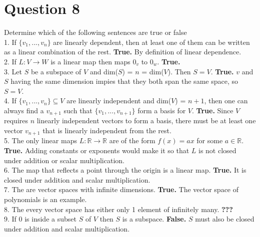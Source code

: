 \documentclass{article}
\begin{document}
\section*{Question 8}
Determine which of the following sentences are true or false \\
1. If $\{v_1, ..., v_n\}$ are linearly dependent, then at least one of them can be written as a linear combination of the rest.
    \newline\textbf{True.} By definition of linear dependence. \\
2. If $L:V \rightarrow W$ is a linear map then maps $0_v$ to $0_w$.
    \newline\textbf{True.} \\
3. Let $S$ be a subspace of $V$ and dim($S$) = $n$ = dim($V$). Then $S = V$.
    \newline\textbf{True.} $v$ and $S$ having the same dimension impies that they both span the same space, so $S = V$. \\
4. If $\{v_1, ..., v_n\} \subseteq V$ are linearly independent and dim($V$) = $n + 1$, then one can always find a $v_{n+1}$ such that $\{v_1, ..., v_{n+1}\}$ form a basis for $V$.
    \newline\textbf{True.} Since $V$ requires $n$ linearly independent vectors to form a basis, there must be at least one vector $v_{n+1}$ that is linearly independent from the rest. \\
5. The only linear maps $L: \mathbb{R} \rightarrow \mathbb{R}$ are of the form $f(x) = ax$ for some $a \in \mathbb{R}$.
    \newline\textbf{True.} Adding constants or exponents would make it so that $L$ is not closed under addition or scalar multiplication. \\
6. The map that reflects a point through the origin is a linear map.
    \newline\textbf{True.} It is closed under addition and scalar multiplication. \\
7. The are vector spaces with infinite dimensions.
    \newline\textbf{True.} The vector space of polynomials is an example. \\
8. The every vector space has either only 1 element of infinitely many.
    \newline\textbf{???} \\
9. If 0 is inside a subset $S$ of $V$ then $S$ is a subspace.
    \newline\textbf{False.} $S$ must also be closed under addition and scalar multiplication. \\
\end{document}

